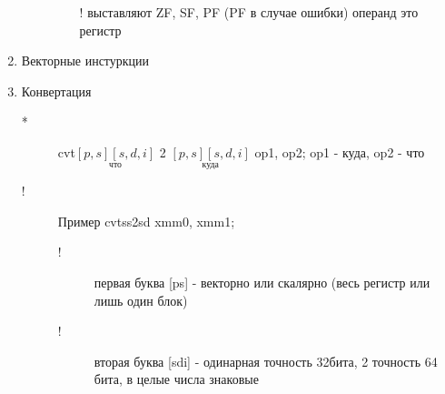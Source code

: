 \documentclass[a4paper, 12pt]{article}
\begin{document}
\begin{enumerate}
\begin{description}
\begin{enumerate}
                \item[!] выставляют ZF, SF, PF (PF в случае ошибки) операнд это регистр
            \end{enumerate}
        \end{description}
        \item Векторные инстуркции
        \item Конвертация
        \begin{description}
            \item[*] cvt$\underset{\text{что}}{[p,s][s,d,i]}$ 2 $\underset{\text{куда}}{[p,s][s,d,i]}$ op1, op2; op1 - куда, op2 - что
            \item[!] Пример cvtss2sd xmm0, xmm1;
            \begin{description}
                \item[!] первая буква [ps] - векторно или скалярно (весь регистр или лишь один блок)
                \item[!] вторая буква [sdi] - одинарная точность 32бита, 2 точность 64 бита, в целые числа знаковые
            \end{description}  
        \end{description}

    \end{enumerate}
    \newpage
\end{document}
